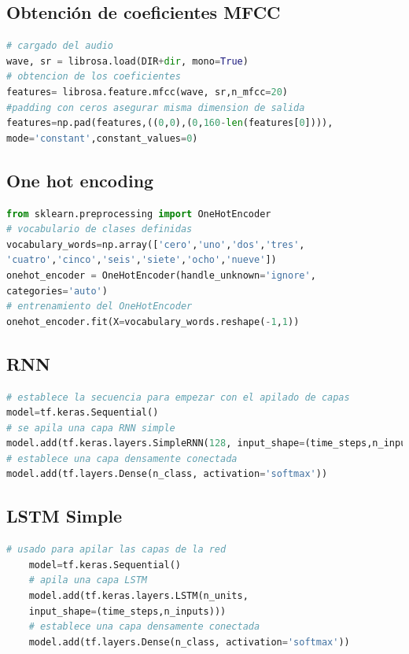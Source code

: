 \subsection{Obtención de coeficientes MFCC}\label{MFCCC}
\begin{lstlisting}[language=Python,caption=Obtención de MFCC,captionpos=b]
# cargado del audio
wave, sr = librosa.load(DIR+dir, mono=True)
# obtencion de los coeficientes
features= librosa.feature.mfcc(wave, sr,n_mfcc=20)
#padding con ceros asegurar misma dimension de salida
features=np.pad(features,((0,0),(0,160-len(features[0]))),
mode='constant',constant_values=0)

\end{lstlisting}

\subsection{One hot encoding}\label{onehot}

\begin{lstlisting}[language=Python,caption=one hot encoding,captionpos=b,xleftmargin=.05\textwidth]
from sklearn.preprocessing import OneHotEncoder
# vocabulario de clases definidas
vocabulary_words=np.array(['cero','uno','dos','tres',
'cuatro','cinco','seis','siete','ocho','nueve'])
onehot_encoder = OneHotEncoder(handle_unknown='ignore',
categories='auto')
# entrenamiento del OneHotEncoder
onehot_encoder.fit(X=vocabulary_words.reshape(-1,1))
\end{lstlisting}

\subsection{RNN}\label{RNNCODE}

\begin{lstlisting}[language=Python,caption=Modelo LSTM,captionpos=b,xleftmargin=.05\textwidth]
# establece la secuencia para empezar con el apilado de capas
model=tf.keras.Sequential()
# se apila una capa RNN simple 
model.add(tf.keras.layers.SimpleRNN(128, input_shape=(time_steps,n_inputs)))
# establece una capa densamente conectada
model.add(tf.layers.Dense(n_class, activation='softmax'))

\end{lstlisting}
\subsection{LSTM Simple}\label{LSTMCODE}
\begin{center}
	\begin{lstlisting}[language=Python,caption=Modelo LSTM,captionpos=b,xleftmargin=.05\textwidth]
	# usado para apilar las capas de la red
	model=tf.keras.Sequential()
	# apila una capa LSTM
	model.add(tf.keras.layers.LSTM(n_units,
	input_shape=(time_steps,n_inputs)))
	# establece una capa densamente conectada
	model.add(tf.layers.Dense(n_class, activation='softmax'))
	
	
	\end{lstlisting}
\end{center}

